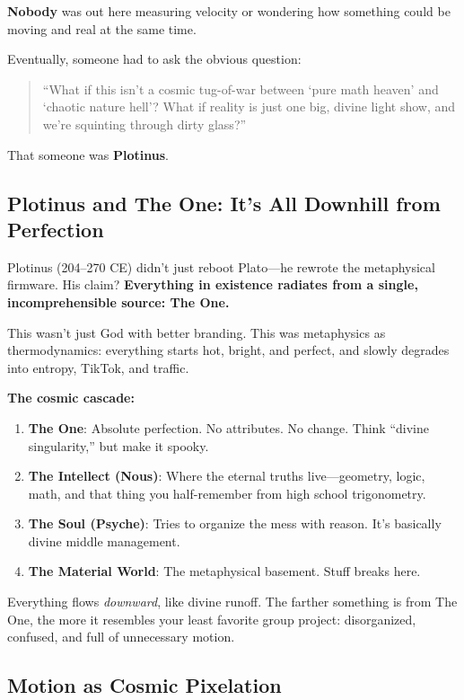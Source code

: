 \textbf{Nobody} was out here measuring velocity or wondering how something could be moving and real at the same time.

Eventually, someone had to ask the obvious question:

\begin{quote}
    “What if this isn’t a cosmic tug-of-war between ‘pure math heaven’ and ‘chaotic nature hell’? What if reality is just one big, divine light show, and we’re squinting through dirty glass?”
\end{quote}

That someone was \textbf{Plotinus}.

\subsection{Plotinus and The One: It's All Downhill from Perfection}

Plotinus (204--270 CE) didn’t just reboot Plato—he rewrote the metaphysical firmware. His claim? \textbf{Everything in existence radiates from a single, incomprehensible source: The One.}

This wasn’t just God with better branding. This was metaphysics as thermodynamics: everything starts hot, bright, and perfect, and slowly degrades into entropy, TikTok, and traffic.

\textbf{The cosmic cascade:}

\begin{enumerate}
    \item \textbf{The One}: Absolute perfection. No attributes. No change. Think “divine singularity,” but make it spooky.
    \item \textbf{The Intellect (Nous)}: Where the eternal truths live—geometry, logic, math, and that thing you half-remember from high school trigonometry.
    \item \textbf{The Soul (Psyche)}: Tries to organize the mess with reason. It's basically divine middle management.
    \item \textbf{The Material World}: The metaphysical basement. Stuff breaks here.
\end{enumerate}

Everything flows \emph{downward}, like divine runoff. The farther something is from The One, the more it resembles your least favorite group project: disorganized, confused, and full of unnecessary motion.

\subsection{Motion as Cosmic Pixelation}

